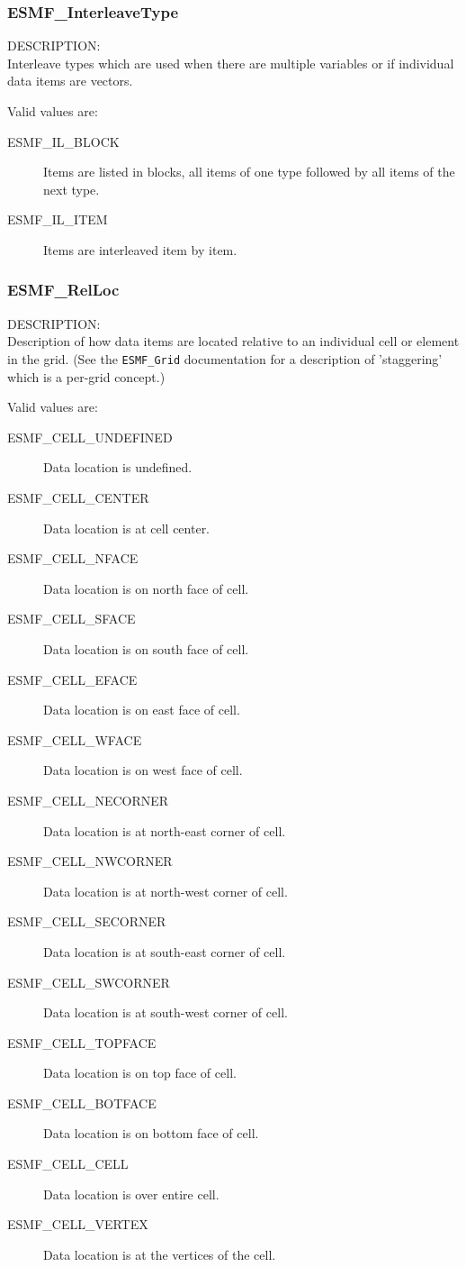 
\subsubsection{ESMF\_InterleaveType}
 
{\sf DESCRIPTION:\\}
Interleave types which are used when there are multiple variables or
if individual data items are vectors.

Valid values are:
\begin{description}
   \item [ESMF\_IL\_BLOCK]
         Items are listed in blocks, all items of one type followed
         by all items of the next type.
   \item [ESMF\_IL\_ITEM]
         Items are interleaved item by item.
\end{description}


\subsubsection{ESMF\_RelLoc}

{\sf DESCRIPTION:\\}
Description of how data items are located relative to an individual
cell or element in the grid. 
(See the {\tt ESMF\_Grid} documentation
for a description of 'staggering' which is a per-grid concept.)

Valid values are:
\begin{description}
  \item[ESMF\_CELL\_UNDEFINED]  Data location is undefined.
  \item[ESMF\_CELL\_CENTER] Data location is at cell center.
  \item[ESMF\_CELL\_NFACE] Data location is on north face of cell.
  \item[ESMF\_CELL\_SFACE] Data location is on south face of cell.
  \item[ESMF\_CELL\_EFACE] Data location is on east face of cell.
  \item[ESMF\_CELL\_WFACE] Data location is on west face of cell.
  \item[ESMF\_CELL\_NECORNER] Data location is at north-east corner of cell.
  \item[ESMF\_CELL\_NWCORNER] Data location is at north-west corner of cell.
  \item[ESMF\_CELL\_SECORNER] Data location is at south-east corner of cell.
  \item[ESMF\_CELL\_SWCORNER] Data location is at south-west corner of cell.
  \item[ESMF\_CELL\_TOPFACE] Data location is on top face of cell.
  \item[ESMF\_CELL\_BOTFACE] Data location is on bottom face of cell.
  \item[ESMF\_CELL\_CELL] Data location is over entire cell.
  \item[ESMF\_CELL\_VERTEX] Data location is at the vertices of the cell.
\end{description}

